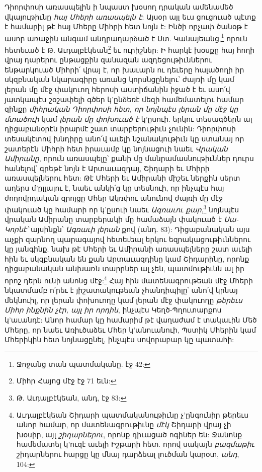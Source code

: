 \documentclass{article}
\begin{document}
{Դիորփոսի առասպելին ի նպաստ խօսող դրական ամենամեծ վկայութիւնը \emph{հայ Մհերի առասպելն է}: Այսօր այլ եւս ցուցուած պէտք է համարիլ թէ հայ Մհերը Միհրի հետ նոյն է: Ինծի որչափ ծանօթ է ասոր առաջին անգամ անդրադարձած է Ստ. Կանայեանց,\footnote{Ջոջանց տան պատմականը. էջ 42:} որուն հետեւած է Թ. Աւդալբէկեան\footnote{Միհր Հայոց մէջ էջ 71 եւն:} եւ ուրիշներ: Ի հարկէ խօսքը հայ հողի վրայ դարերու ընթացքին զանազան ազդեցութիւններու ենթարկուած Միհրի՛ վրայ է, որ խաւարն ու դեւերը հալածողի իր սկզբնական նկարագիրը առանց կորսնցընելու՝ ժայռի մը կամ լերան մը մէջ փակուող հերոսի աստիճանին իջած է եւ ասո՛վ յատկապէս շօշափելի գծեր կ'ընձեռէ մեզի համեմատելու համար զինքը \emph{միհրական Դիորփոսի հետ, որ նոյնպէս լերան մը մէջ կը մտածուի} կամ \emph{լերան մը փոխուած է} կ'ըսուի. երկու տեսագծերն ալ դիցաբանօրէն իրարմէ շատ տարբերութիւն չունին: Դիորփոսի տեսակէտով խնդիրը անո՛վ աւելի նշանակութիւն կը ստանայ որ շատերէն Միհրի հետ իրաւամբ կը նոյնացուի նաեւ \emph{Վրական Ամիրանը}, որուն առասպելը՝ քանի մը մանրամասնութիւններ դուրս հանելով՝ գրեթէ նոյն է Արտաւազդայ, Շիդարի եւ Մհիրի առասպելներու հետ: Թէ Մհերի եւ Ամիրանի միշեւ ներքին սերտ աղերս մ'ըլլալու է, նաեւ անկի՛ց կը տեսնուի, որ ինչպէս հայ ժողովրդական զրոյցը Մհեր Ակռփու անունով ժայռի մը մէջ փակուած կը համարի որ կ'ըսուի նաեւ \emph{Ագռաւու քար},\footnote{Թ. Աւդալբէկեան, անդ, էջ 83:} նոյնպէս վրական Ամիրանը տարբերակի մը համաձայն փակուած է \emph{Սա-Կորնէ՝} այսինքն՝ \emph{Ագռաւի լերան} քով (անդ. 83): Դիցաբանական այս աչքի զարնող պարագայով հետեւեալ երկու եզրակացութիւններու կը յանգինք. նախ թէ Մհերի եւ Ամիրանի առասպելները շատ աւելի հին եւ սկզբնական են քան Արտաւազդինը կամ Շիդարինը, որոնք դիցաբանական անխառն տարրներ ալ չեն, պատմութիւնն ալ իր որոշ դերն ունի անոնց մէջ:\footnote{Աւդալբէկեան Շիդարի պատմականութիւնը չ'ընգունիր թերեւս անոր համար, որ մատենագրութիւնը \emph{մէկ} Շիդարի վրայ չի խօսիր, այլ \emph{շիդարներու}, որոնք դիւացած ոգիներ են: Ջանոնք համեմատել կ'ուզէ աւելի Իշթարի հետ. որով սակայն \emph{բազմաթիւ} շիդարներու հարցը կը մնայ դարձեալ լուծման կարօտ, \emph{անդ}, 104:} Հայ հին մատենագրութեան մէջ Մհերի նկատմամբ ո՛րեւ է յիշատակութեան չհանդիպիլը՝ անո՛վ կրնայ մեկնուիլ, որ լերան փոխուողը կամ լերան մէջ փակուողը \emph{թերեւս Միհր ինքնին չէր, այլ իր որդին}, ինչպէս Կեղծ-Պղուտարքոս կ'աւանդէ: Անոր համար կը համարիմ թէ վաղաժամ է տակաւին Մեծ Մհերը, որ նաեւ Առիւծաձեւ Մհեր կ'անուանուի, Պստիկ Մհերին կամ Մհերիկին հետ նոյնացընել, ինչպէս սովորաբար կը պատահի:

}
\end{document}
